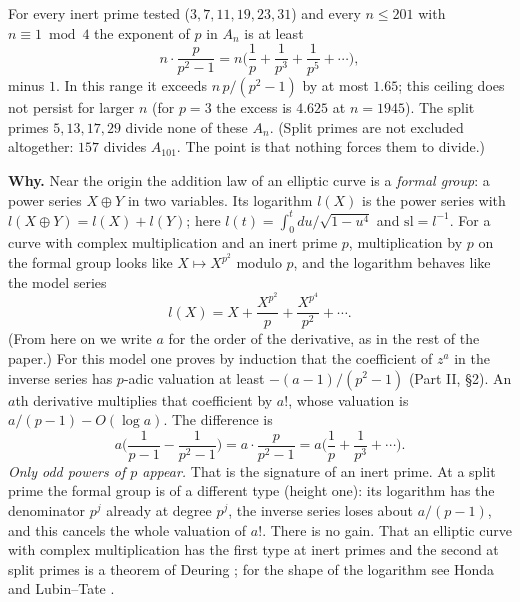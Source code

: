 \documentclass[11pt,letterpaper]{article}
\begin{document}
\noindent For every inert prime tested ($3,7,11,19,23,31$) and every $n\le201$ with $n\equiv1\bmod4$ the exponent of $p$ in $A_n$ is at least
\begin{equation}\label{D:9}
 n\cdot\frac{p}{p^2-1}=n\Big(\frac1p+\frac1{p^3}+\frac1{p^5}+\cdots\Big),
\end{equation}
minus $1$. In this range it exceeds $n\,p/(p^2-1)$ by at most $1.65$; this ceiling does not persist for larger $n$
(for $p=3$ the excess is $4.625$ at $n=1945$). The split primes $5,13,17,29$ divide none of these $A_n$. (Split primes are not excluded
altogether: $157$ divides $A_{101}$. The point is that nothing forces them to divide.)

\textbf{Why.} Near the origin the addition law of an elliptic curve is a \emph{formal group}: a power series
$X\oplus Y$ in two variables. Its logarithm $l(X)$ is the power series with $l(X\oplus Y)=l(X)+l(Y)$; here
$l(t)=\int_0^tdu/\sqrt{1-u^4}$ and $\mathrm{sl}=l^{-1}$. For a curve with complex multiplication and an
inert prime $p$, multiplication by $p$ on the formal group looks like $X\mapsto X^{p^2}$ modulo $p$, and the
logarithm behaves like the model series
\begin{equation}\label{D:10}
 l(X)=X+\frac{X^{p^2}}{p}+\frac{X^{p^4}}{p^2}+\cdots .
\end{equation}
(From here on we write $a$ for the order of the derivative, as in the rest of the paper.) For this model one proves by induction that the coefficient of $z^a$ in the inverse series has $p$-adic
valuation at least $-(a-1)/(p^2-1)$ (Part II, \S2). An $a$th derivative
multiplies that coefficient by $a!$, whose valuation is $a/(p-1)-O(\log a)$. The difference is
\begin{equation}\label{D:11}
 a\Big(\frac1{p-1}-\frac1{p^2-1}\Big)=a\cdot\frac p{p^2-1}=a\Big(\frac1p+\frac1{p^3}+\cdots\Big).
\end{equation}
\emph{Only odd powers of $p$ appear.} That is the signature of an inert prime. At a split prime the formal group is of a different type (height one): its logarithm has the denominator
$p^j$ already at degree $p^j$, the inverse series loses about $a/(p-1)$, and this cancels the whole
valuation of $a!$. There is no gain. That an elliptic curve with complex multiplication has the first type
at inert primes and the second at split primes is a theorem of Deuring \cite{Deu41}; for the shape of the
logarithm see Honda \cite{Hon70} and Lubin--Tate \cite{LT65}.
\end{document}
